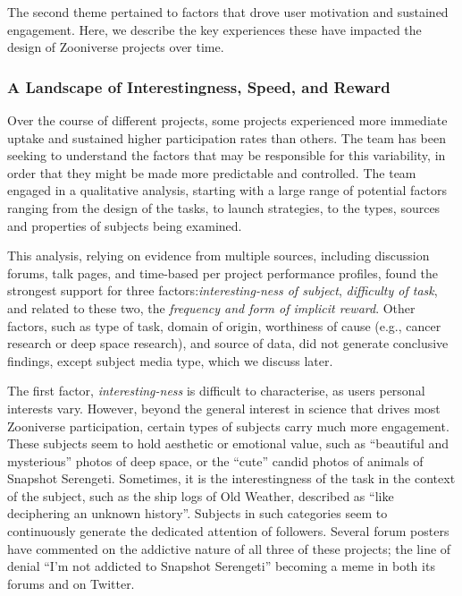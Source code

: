\documentclass{sigchi}
\begin{document}
The second theme pertained to factors that drove user motivation and sustained engagement. Here, we describe the key experiences these have impacted the design of Zooniverse projects over time.

\subsubsection{A Landscape of Interestingness, Speed, and Reward} 
Over the course of different projects, some projects experienced more immediate uptake and sustained higher participation rates than others.  The team has been seeking to understand the factors that may be responsible for this variability, in order that they might be made more predictable and controlled.  The team engaged in a qualitative analysis, starting with a large range of potential factors ranging from the design of the tasks, to launch strategies, to the types, sources and properties of subjects being examined. 

This analysis, relying on evidence from multiple sources, including discussion forums, talk pages, and time-based per project performance profiles, found the strongest support for three factors:\emph{interesting-ness of subject}, \emph{difficulty of task}, and related to these two, the \emph{frequency and form of implicit reward}. Other factors, such as type of task, domain of origin, worthiness of cause (e.g., cancer research or deep space research), and source of data, did not generate conclusive findings, except subject media type, which we discuss later.

The first factor, \emph{interesting-ness} is difficult to characterise, as users personal interests vary.  However, beyond the general interest in science that drives most Zooniverse participation, certain types of subjects carry much more engagement.  These subjects seem to hold aesthetic or emotional value, such as ``beautiful and mysterious'' photos of deep space, or the ``cute'' candid photos of animals of Snapshot Serengeti.  Sometimes, it is the interestingness of the task in the context of the subject, such as the ship logs of Old Weather, described as ``like deciphering an unknown history''.  Subjects in such categories seem to continuously generate the dedicated attention of followers.  Several forum posters have commented on the addictive nature of all three of these projects; the line of denial ``I'm not addicted to Snapshot Serengeti'' becoming a meme in both its forums and on Twitter.
\end{document}
